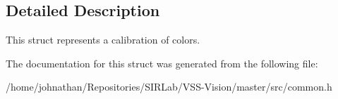 \subsection{Detailed Description}
This struct represents a calibration of colors. 

The documentation for this struct was generated from the following file\+:\begin{DoxyCompactItemize}
\item 
/home/johnathan/\+Repositories/\+S\+I\+R\+Lab/\+V\+S\+S-\/\+Vision/master/src/common.\+h\end{DoxyCompactItemize}
